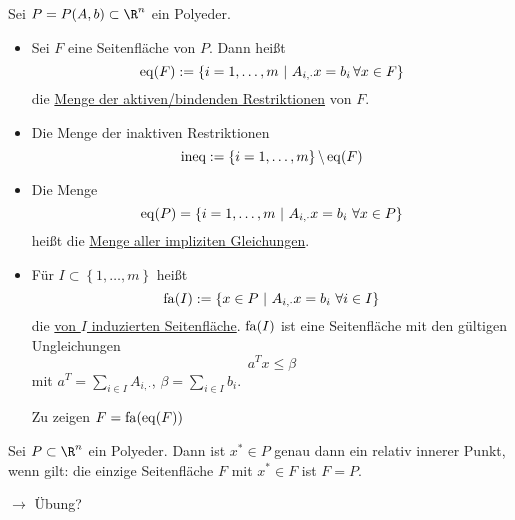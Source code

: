 \begin{definition}
  Sei $P = P(A,b) \subset \R^n$ ein Polyeder.
  \begin{itemize}
    \item Sei $F$ eine Seitenfläche von $P$. Dann heißt
      \begin{equation*}
        \eq(F):=\left\{ i = 1,\dots ,m\ |\ A_{i,\cdot}x = b_{i}\, \forall x \in F \right\}
      \end{equation*}
      die \underline{Menge der aktiven/bindenden Restriktionen} von $F$.
    \item Die Menge der inaktiven  Restriktionen
      \begin{equation*}
        \text{ineq}:= \left\{i=1,\dots ,m \right\}\backslash \operatorname{eq}(F)
      \end{equation*}
    \item Die Menge
      \begin{equation*}
        \operatorname{eq}(P) = \left\{ i =1,\dots ,m \ |\ A_{i,\cdot}x =b_{i} \ \forall x \in P \right\}
      \end{equation*}
      heißt die \underline{Menge aller impliziten Gleichungen}.
    \item Für $I \subset  \left\{ 1,\dots ,m \right\}$ heißt
      \begin{equation*}
        \fa(I):=\left\{x \in P \ |\ A_{i,\cdot}x = b_{i} \ \forall i \in I \right\}
      \end{equation*}
      die \underline{von $I$ induzierten Seitenfläche}.
      $\operatorname{fa}(I)$ ist eine Seitenfläche mit den gültigen Ungleichungen
      \begin{equation*}
        a^{T} x \leq \beta
      \end{equation*}
      mit $a^{T} = \sum\limits_{i \in I}^{} A_{i,\cdot}$, $\beta = \sum\limits_{i \in I}^{} b_{i}$.

      Zu zeigen $F = \operatorname{fa}(\operatorname{eq}(F))$
  \end{itemize}
\end{definition}
\begin{lemma}
	Sei $P\subset \R^n$ ein Polyeder. Dann ist $x^* \in P$ genau dann ein relativ innerer Punkt, wenn gilt: die einzige Seitenfläche $F$ mit $x^* \in F$ ist $F=P$.
\end{lemma}
\begin{beweis}
	$\to$ Übung?
\end{beweis}

